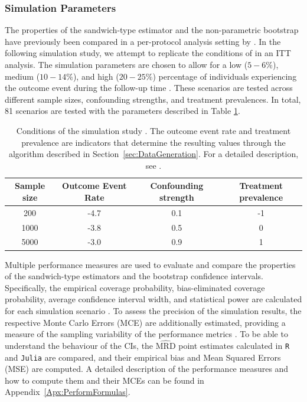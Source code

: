 \documentclass[pdflatex,sn-vancouver-ay]{sn-jnl}%
\theoremstyle{thmstyleone}%
\theoremstyle{thmstyletwo}%
\theoremstyle{thmstylethree}%
\newcommand{\Rlang}{\texttt{R}}
\newcommand{\julia}{\texttt{Julia}}
\begin{document}
\subsubsection{Simulation Parameters}\label{sec:SimParams}

The properties of the sandwich-type estimator and the non-parametric bootstrap have previously been compared in a per-protocol analysis setting by \cite{limozinInferenceProceduresSequential2024}. In the following simulation study, we attempt to replicate the conditions of \cite{limozinInferenceProceduresSequential2024} in an ITT analysis. The simulation parameters are chosen to allow for a low ($5-6\%$), medium ($10-14\%$), and high ($20-25\%$) percentage of individuals experiencing the outcome event during the follow-up time \citep{limozinInferenceProceduresSequential2024}. These scenarios are tested across different sample sizes, confounding strengths, and treatment prevalences. In total, 81 scenarios are tested with the parameters described in Table \ref{tab:Sim1_cond}. 

\begin{table}[htbp]
\centering
\begin{tabular*}{\textwidth}{@{\extracolsep\fill}cccc}
\hline
\textbf{Sample size} & \textbf{Outcome Event Rate} & \textbf{Confounding strength} & \textbf{Treatment prevalence} \\
\hline
200  & -4.7 &  0.1 & -1 \\
1000 & -3.8 &  0.5 &  0 \\
5000 & -3.0 &  0.9 &  1 \\
\hline
\end{tabular*}
\caption{Conditions of the simulation study \citep{limozinInferenceProceduresSequential2024}. The outcome event rate and treatment prevalence are indicators that determine the resulting values through the algorithm described in Section~\ref{sec:DataGeneration}. For a detailed description, see \cite{youngSimulationKnownCox2014}.}
\label{tab:Sim1_cond}
\end{table}

Multiple performance measures are used to evaluate and compare the properties of the sandwich-type estimators and the bootstrap confidence intervals. Specifically, the empirical coverage probability, bias-eliminated coverage probability, average confidence interval width, and statistical power are calculated for each simulation scenario \citep{morrisUsingSimulationStudies2019a}. To assess the precision of the simulation results, the respective Monte Carlo Errors (MCE) are additionally estimated, providing a measure of the sampling variability of the performance metrics \citep{morrisUsingSimulationStudies2019a}. To be able to understand the behaviour of the CIs, the $\operatorname{\widehat{MRD}}$ point estimates calculated in \Rlang{} and \julia{} are compared, and their empirical bias and Mean Squared Errors (MSE) are computed. A detailed description of the performance measures and how to compute them and their MCEs can be found in Appendix~\ref{Apx:PerformFormulas}.
\end{document}
